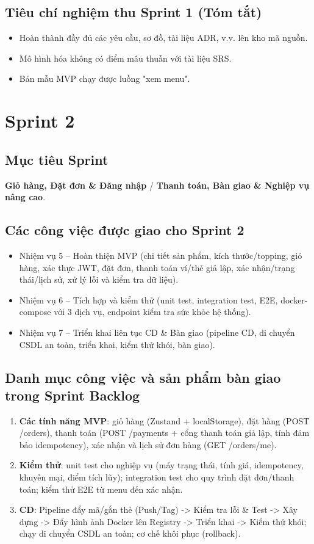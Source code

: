 \documentclass[12pt, a4paper]{article}
\begin{document}
\subsection{Tiêu chí nghiệm thu Sprint 1 (Tóm tắt)}
\begin{itemize}
  \item Hoàn thành đầy đủ các yêu cầu, sơ đồ, tài liệu ADR, v.v. lên kho mã nguồn.
  \item Mô hình hóa không có điểm mâu thuẫn với tài liệu SRS.
  \item Bản mẫu MVP chạy được luồng "xem menu".
\end{itemize}

\section{Sprint 2}
\label{sec:sprint2}

\subsection{Mục tiêu Sprint}
\textbf{Giỏ hàng, Đặt đơn \& Đăng nhập} / \textbf{Thanh toán, Bàn giao \& Nghiệp vụ nâng cao}.

\subsection{Các công việc được giao cho Sprint 2}
\begin{itemize}
  \item Nhiệm vụ 5 -- Hoàn thiện MVP (chi tiết sản phẩm, kích thước/topping, giỏ hàng, xác thực JWT, đặt đơn, thanh toán ví/thẻ giả lập, xác nhận/trạng thái/lịch sử, xử lý lỗi và kiểm tra dữ liệu).
  \item Nhiệm vụ 6 -- Tích hợp và kiểm thử (unit test, integration test, E2E, docker-compose với 3 dịch vụ, endpoint kiểm tra sức khỏe hệ thống).
  \item Nhiệm vụ 7 -- Triển khai liên tục CD \& Bàn giao (pipeline CD, di chuyển CSDL an toàn, triển khai, kiểm thử khói, bàn giao).
\end{itemize}

\subsection{Danh mục công việc và sản phẩm bàn giao trong Sprint Backlog}
\begin{enumerate}
  \item \textbf{Các tính năng MVP}: giỏ hàng (Zustand + localStorage), đặt hàng (POST /orders), thanh toán (POST /payments + cổng thanh toán giả lập, tính đảm bảo idempotency), xác nhận và lịch sử đơn hàng (GET /orders/me).
  \item \textbf{Kiểm thử}: unit test cho nghiệp vụ (máy trạng thái, tính giá, idempotency, khuyến mại, điểm tích lũy); integration test cho quy trình đặt đơn/thanh toán; kiểm thử E2E từ menu đến xác nhận.
  \item \textbf{CD}: Pipeline đẩy mã/gắn thẻ (Push/Tag) -> Kiểm tra lỗi \& Test -> Xây dựng -> Đẩy hình ảnh Docker lên Registry -> Triển khai -> Kiểm thử khói; chạy di chuyển CSDL an toàn; cơ chế khôi phục (rollback).
\end{enumerate}
\end{document}
